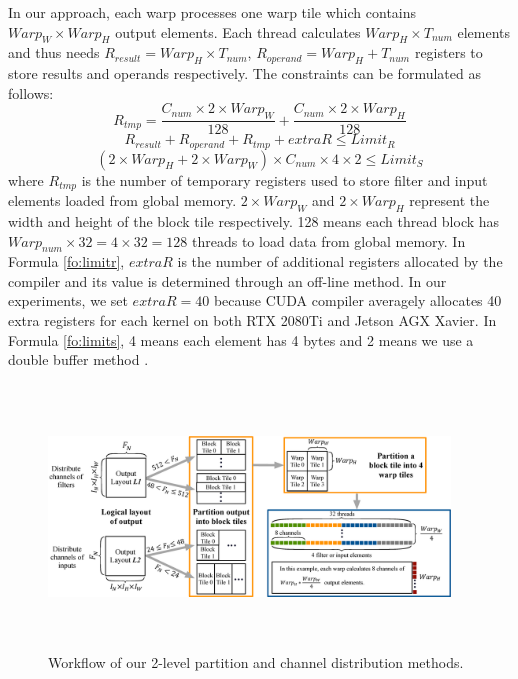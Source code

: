 In our approach, each warp processes one warp tile which contains $Warp_W \times Warp_H$ output elements.
Each thread calculates $Warp_H \times T_{num}$ elements and thus needs $R_{result}=Warp_H \times T_{num}$, $R_{operand}=Warp_H+T_{num}$ registers to store results and operands respectively.
The constraints can be formulated as follows:
\begin{equation}\nonumber
R_{tmp}=\frac{C_{num} \times 2 \times Warp_W}{128}+\frac{C_{num}  \times 2 \times Warp_H}{128}
\end{equation}
\begin{equation}
    \label{fo:limitr}
R_{result}+R_{operand}+R_{tmp}+extraR \leq Limit_R
\end{equation}
\begin{equation}
    \label{fo:limits}
(2 \times Warp_H+2 \times Warp_W)\times C_{num} \times 4 \times 2 \leq Limit_S
\end{equation}
where $R_{tmp}$ is the number of temporary registers used to store filter and input elements loaded from global memory.
$2 \times Warp_W$ and $2 \times Warp_H$ represent the width and height of the block tile respectively. 128 means each thread block has $Warp_{num} \times 32 = 4 \times 32=128$ threads to load data from global memory.
In Formula \ref{fo:limitr}, $extraR$ is the number of additional registers allocated by the compiler and its value is determined through an off-line method. {\color{red}In our experiments, we set $extraR=40$ because CUDA compiler averagely allocates 40 extra registers for each kernel on both RTX 2080Ti and Jetson AGX Xavier.} In Formula \ref{fo:limits}, 4 means each element has 4 bytes and 2 means we use a double buffer method \cite{abdelfattah2019fast,nichols2019magmadnn}.
\begin{figure}
	\centering
    \includegraphics[width=0.95\textwidth,height=7cm]{./figure/pwworkflow.eps}
    \vspace{-3mm}
    \caption{Workflow of our 2-level partition and channel distribution methods.} \label{fig:pwworkflow}
\end{figure}
